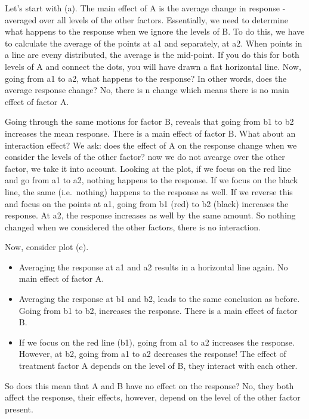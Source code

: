 \documentclass[
  letterpaper,
]{book}
\providecommand{\tightlist}{%
  \setlength{\itemsep}{0pt}\setlength{\parskip}{0pt}}\usepackage{longtable,booktabs,array}
\begin{document}
Let's start with (a). The main effect of A is the average change in
response - averaged over all levels of the other factors. Essentially,
we need to determine what happens to the response when we ignore the
levels of B. To do this, we have to calculate the average of the points
at a1 and separately, at a2. When points in a line are eveny
distributed, the average is the mid-point. If you do this for both
levels of A and connect the dots, you will have drawn a flat horizontal
line. Now, going from a1 to a2, what happens to the response? In other
words, does the average response change? No, there is n change which
means there is no main effect of factor A.

Going through the same motions for factor B, reveals that going from b1
to b2 increases the mean response. There is a main effect of factor B.
What about an interaction effect? We ask: does the effect of A on the
response change when we consider the levels of the other factor? now we
do not avearge over the other factor, we take it into account. Looking
at the plot, if we focus on the red line and go from a1 to a2, nothing
happens to the response. If we focus on the black line, the same
(i.e.~nothing) happens to the response as well. If we reverse this and
focus on the points at a1, going from b1 (red) to b2 (black) increases
the response. At a2, the response increases as well by the same amount.
So nothing changed when we considered the other factors, there is no
interaction.

Now, consider plot (e).

\begin{itemize}
\tightlist
\item
  Averaging the response at a1 and a2 results in a horizontal line
  again. No main effect of factor A.
\item
  Averaging the response at b1 and b2, leads to the same conclusion as
  before. Going from b1 to b2, increases the response. There is a main
  effect of factor B.
\item
  If we focus on the red line (b1), going from a1 to a2 increases the
  response. However, at b2, going from a1 to a2 decreases the response!
  The effect of treatment factor A depends on the level of B, they
  interact with each other.
\end{itemize}

So does this mean that A and B have no effect on the response? No, they
both affect the response, their effects, however, depend on the level of
the other factor present.
\end{document}
